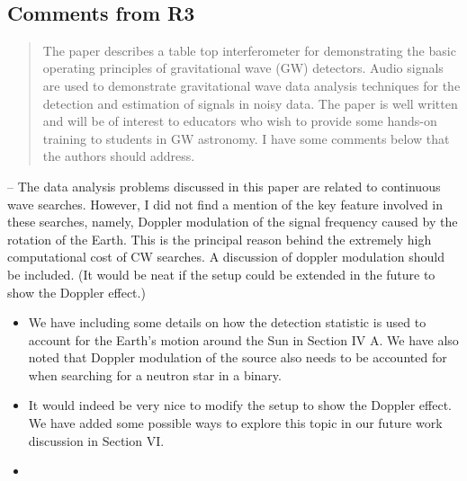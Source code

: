 \documentclass{article}
\begin{document}
\hspace{1em}\vspace{2em}\\

\subsection*{Comments from R3}

\begin{quote}
The paper describes a table top interferometer for demonstrating the basic operating principles of gravitational wave (GW) detectors. Audio signals are used to demonstrate gravitational wave data analysis techniques for the detection and estimation of signals in noisy data. The paper is well written and will be of interest to educators who wish to provide some hands-on training to students in GW astronomy. I have some comments below that the authors should address.
\end{quote}

\noindent 
-- The data analysis problems discussed in this paper are related to continuous wave searches. However, I did not find a mention of the key feature involved in these searches, namely, Doppler modulation of the signal frequency caused by the rotation of the Earth. This is the principal reason behind the extremely high computational cost of CW searches. A discussion of doppler modulation should be included. (It would be neat if the setup could be extended in the future to show the Doppler effect.)
\begin{itemize}
\item We have including some details on how the detection statistic is used to account for the Earth's motion around the Sun in Section IV A. We have also noted that Doppler modulation of the source also needs to be accounted for when searching for a neutron star in a binary.
\item It would indeed be very nice to modify the setup to show the Doppler effect. We have added some possible ways to explore this topic in our future work discussion in Section VI. 
\item[]
\end{itemize}
\end{document}
